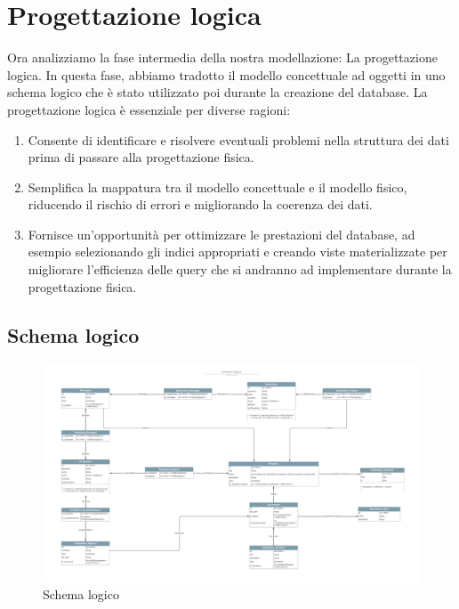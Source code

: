 \documentclass{report}
\begin{document}
\section{Progettazione logica}
Ora analizziamo la fase intermedia della nostra modellazione: La progettazione logica. 
In questa fase, abbiamo tradotto il modello concettuale ad oggetti in uno schema logico che è stato utilizzato poi durante la creazione del database. La progettazione logica è essenziale per diverse ragioni:
\begin{enumerate}
\item Consente di identificare e risolvere eventuali problemi nella struttura dei dati prima di passare alla progettazione fisica.
\item Semplifica la mappatura tra il modello concettuale e il modello fisico, riducendo il rischio di errori e migliorando la coerenza dei dati.
\item Fornisce un'opportunità per ottimizzare le prestazioni del database, ad esempio selezionando gli indici appropriati e creando viste materializzate per migliorare l'efficienza delle query che si andranno ad implementare durante la progettazione fisica.
\end{enumerate}

\subsection{Schema logico}
\begin{figure}
\centering
\includegraphics[width=1.00\textwidth]{Schema logico.pdf}
\caption{Schema logico}
\end{figure}
\newpage
\end{document}
